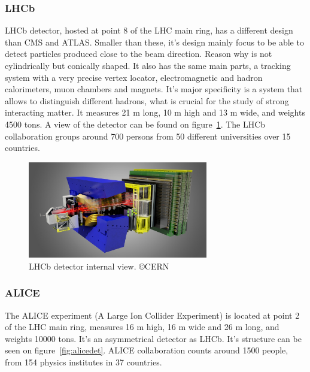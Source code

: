 \subsubsection{LHCb}
\label{sec:lhcb}

LHCb detector, hosted at point 8 of the LHC main ring, has a different design than CMS and ATLAS. Smaller than these, it's design mainly focus to be able to detect particles produced close to the beam direction. Reason why is not cylindrically but conically shaped. It also has the same main parts, a tracking system with a very precise vertex locator, electromagnetic and hadron calorimeters, muon chambers and magnets. It's major specificity is a system that allows to distinguish different hadrons, what is crucial for the study of strong interacting matter. It measures 21 m long, 10 m high and 13 m wide, and weights 4500 tons. A view of the detector can be found on figure~\ref{fig:lhcbdet}. The LHCb collaboration groups around 700 persons from 50 different universities over 15 countries. 

\begin{figure}[!Hhtbp]
  \begin{center}
    \includegraphics[width=0.7\textwidth]{figs/LHCbDetectorlight1.jpg}
    \caption{LHCb detector internal view. \copyright CERN}
    \label{fig:lhcbdet}
  \end{center}
\end{figure}

\subsubsection{ALICE}
\label{sec:alice}

The ALICE experiment (A Large Ion Collider Experiment) is located at point 2 of the LHC main ring, measures 16 m high, 16 m wide and 26 m long, and weights 10000 tons. It's an asymmetrical detector as LHCb. It's structure can be seen on figure~\ref{fig:alicedet}. ALICE collaboration counts around 1500 people, from 154 physics institutes in 37 countries. 

